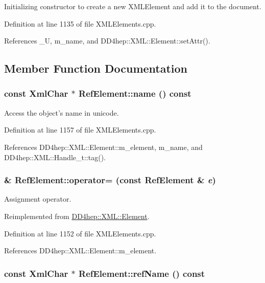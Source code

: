 Initializing constructor to create a new XMLElement and add it to the document. 

Definition at line 1135 of file XMLElements.cpp.

References \_\-U, m\_\-name, and DD4hep::XML::Element::setAttr().

\subsection{Member Function Documentation}
\hypertarget{class_d_d4hep_1_1_x_m_l_1_1_ref_element_a3bdb94c1c90405444a2d3cb0fd6e3d8d}{
\subsubsection[{name}]{\setlength{\rightskip}{0pt plus 5cm}const {\bf XmlChar} $\ast$ RefElement::name () const}}
\label{class_d_d4hep_1_1_x_m_l_1_1_ref_element_a3bdb94c1c90405444a2d3cb0fd6e3d8d}


Access the object's name in unicode. 

Definition at line 1157 of file XMLElements.cpp.

References DD4hep::XML::Element::m\_\-element, m\_\-name, and DD4hep::XML::Handle\_\-t::tag().\hypertarget{class_d_d4hep_1_1_x_m_l_1_1_ref_element_a5af29e6f73c8b0e1aa23dff6dbe8b39d}{
\subsubsection[{operator=}]{ \& RefElement::operator= (const {\bf RefElement} \& {\em e})}}
\label{class_d_d4hep_1_1_x_m_l_1_1_ref_element_a5af29e6f73c8b0e1aa23dff6dbe8b39d}


Assignment operator. 

Reimplemented from \hyperlink{class_d_d4hep_1_1_x_m_l_1_1_element_afa8ba01485168c3492bd913c22bc8c0d}{DD4hep::XML::Element}.

Definition at line 1152 of file XMLElements.cpp.

References DD4hep::XML::Element::m\_\-element.\hypertarget{class_d_d4hep_1_1_x_m_l_1_1_ref_element_ab7f8c264c97670244ff179b7c89e8dfa}{
\subsubsection[{refName}]{\setlength{\rightskip}{0pt plus 5cm}const {\bf XmlChar} $\ast$ RefElement::refName () const}}
\label{class_d_d4hep_1_1_x_m_l_1_1_ref_element_ab7f8c264c97670244ff179b7c89e8dfa}


